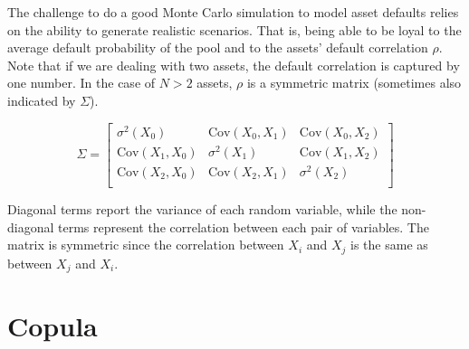 %
%

The challenge to do a good Monte Carlo simulation to model asset defaults relies on the ability to generate realistic scenarios. That is, being able to be loyal to the average default probability of the pool and to the assets’ default correlation $\rho$. Note that if we are dealing with two assets, the default correlation is captured by one number. In the case of $N>2$ assets, $\rho$ is a symmetric matrix (sometimes also indicated by $\Sigma$).

\begin{equation*}
\Sigma = \begin{bmatrix}
\sigma^2 (X_0) & \mathrm{Cov}(X_0, X_1) & \mathrm{Cov}(X_0, X_2)\\
 \mathrm{Cov}(X_1, X_0) & \sigma^2 (X_1) & \mathrm{Cov}(X_1, X_2)\\
 \mathrm{Cov}(X_2, X_0) & \mathrm{Cov}(X_2, X_1) & \sigma^2 (X_2)\\
\end{bmatrix}
\end{equation*}
 
Diagonal terms report the variance of each random variable, while the non-diagonal terms represent the correlation between each pair of variables. The matrix is symmetric since the correlation between $X_i$ and $X_j$ is the same as between $X_j$ and $X_i$.

\section{Copula}

